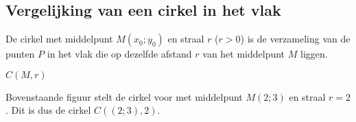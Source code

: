 
\subsection{Vergelijking van een cirkel in het vlak}
\noindent

\begin{definitie}
	De cirkel met middelpunt $M(x_0;y_0)$ en straal $r$ ($r>0$) is de verzameling van de punten $P$ in het vlak die op dezelfde afstand $r$ van het middelpunt $M$ liggen.
\end{definitie}

\begin{notatie}
	$C(M,r)$
\end{notatie}

\begin{center}
\end{center}



Bovenstaande figuur stelt de cirkel voor met middelpunt $M(2;3)$ en straal $r=2$.
Dit is dus de cirkel $C((2;3),2)$.\\

